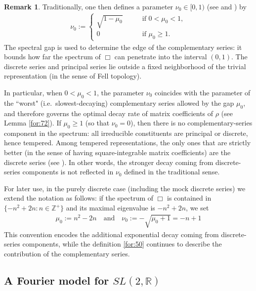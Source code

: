 \documentclass[11 pt]{amsart}
\newcommand{\RR}{\mathbb{R}}
\newcommand{\ZZ}{\mathbb{Z}}
\theoremstyle{definition}
\newtheorem{remark}[theorem]{Remark}
\numberwithin{equation}{section}
\begin{document}
\begin{remark}\label{re:9} Traditionally, one then defines a parameter $\nu_0 \in [0,1)$ (see \cite{Forni} and \cite{tan}) by
\begin{align}\label{for:50}
\nu_0 :=
\begin{cases}
\sqrt{1 - \mu_0} \qquad & \text{if } 0<\mu_0 < 1, \\
0 \qquad & \text{if } \mu_0 \geq 1.
\end{cases}
\end{align}
The spectral gap is used to determine the edge of the complementary series: it bounds how far the spectrum of $\Box$ can penetrate into the interval $(0,1)$. The discrete series and principal series lie outside a fixed neighborhood of the trivial representation  (in the sense of Fell topology).

In particular, when $0<\mu_0<1$, the parameter $\nu_0$ coincides with the parameter of the ``worst" (i.e.\ slowest-decaying) complementary series allowed by the gap $\mu_0$, and therefore governs the optimal decay rate of matrix coefficients of $\rho$ (see Lemma \ref{for:72}). If $\mu_0\ge 1$ (so that $\nu_0=0$), then there is no complementary-series component in the spectrum: all irreducible constituents are principal or discrete, hence tempered. Among tempered representations, the only ones that are strictly better (in the sense of having square-integrable matrix coefficients) are the discrete series (see \cite{Warner}). In other words, the stronger decay coming from discrete-series components is not reflected in $\nu_0$ defined in the traditional sense.

For later use, in the purely discrete case (including the mock discrete series) we extend the notation as follows: if the spectrum of $\Box$ is contained in $\{-n^2+2n : n\in\ZZ^+\}$ and its maximal eigenvalue is $-n^2+2n$, we set
\begin{align}\label{for:213}
\mu_0:=n^2-2n \quad\text{and}\quad \nu_0:= -\sqrt{\mu_0+1}= -n+1
\end{align}
This convention encodes the additional exponential decay coming from discrete-series components, while the definition \eqref{for:50} continues to describe the contribution of the complementary series.

\end{remark}

\subsection{A Fourier model for $SL(2, \RR)$}\label{sec:3}
\end{document}
